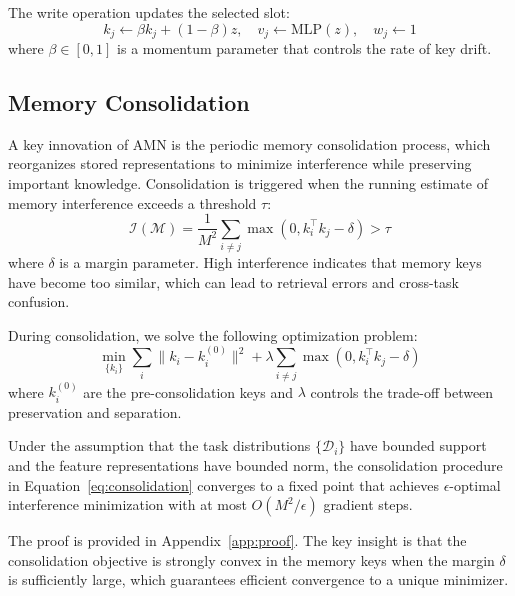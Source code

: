 \documentclass[11pt]{article}
\begin{document}
The write operation updates the selected slot:
\begin{equation}
    k_j \leftarrow \beta k_j + (1 - \beta) z, \quad v_j \leftarrow \text{MLP}(z), \quad w_j \leftarrow 1
\end{equation}
where $\beta \in [0, 1]$ is a momentum parameter that controls the rate of key drift.

\subsection{Memory Consolidation}
\label{sec:consolidation}

A key innovation of AMN is the periodic memory consolidation process, which reorganizes stored representations to minimize interference while preserving important knowledge. Consolidation is triggered when the running estimate of memory interference exceeds a threshold $\tau$:
\begin{equation}
    \mathcal{I}(\mathcal{M}) = \frac{1}{M^2} \sum_{i \neq j} \max(0, k_i^\top k_j - \delta) > \tau
\end{equation}
where $\delta$ is a margin parameter. High interference indicates that memory keys have become too similar, which can lead to retrieval errors and cross-task confusion.

During consolidation, we solve the following optimization problem:
\begin{equation}
    \min_{\{k_i\}} \sum_{i} \|k_i - k_i^{(0)}\|^2 + \lambda \sum_{i \neq j} \max(0, k_i^\top k_j - \delta)
    \label{eq:consolidation}
\end{equation}
where $k_i^{(0)}$ are the pre-consolidation keys and $\lambda$ controls the trade-off between preservation and separation.

\begin{theorem}
\label{thm:convergence}
Under the assumption that the task distributions $\{\mathcal{D}_i\}$ have bounded support and the feature representations have bounded norm, the consolidation procedure in Equation~\ref{eq:consolidation} converges to a fixed point that achieves $\epsilon$-optimal interference minimization with at most $O(M^2 / \epsilon)$ gradient steps.
\end{theorem}

The proof is provided in Appendix~\ref{app:proof}. The key insight is that the consolidation objective is strongly convex in the memory keys when the margin $\delta$ is sufficiently large, which guarantees efficient convergence to a unique minimizer.
\end{document}
